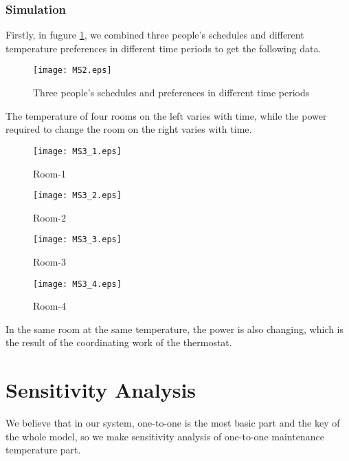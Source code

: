 \documentclass{mcmthesis}
\begin{document}
				
			
			\subsubsection{Simulation}
				Firstly, in fugure \ref{fig:M4_P}, we combined three people's schedules and different temperature preferences in different time periods to get the following data.
				
				\begin{figure}[htb]
					\small
					\centering
					\texttt{[image: MS2.eps]}
					\caption{Three people's schedules and preferences in different time periods} \label{fig:M4_P}
				\end{figure}
			
				The temperature of four rooms on the left varies with time, while the power required to change the room on the right varies with time. 
				
				\begin{figure}[h]
					\small
					\centering
					\texttt{[image: MS3\_1.eps]}
					\caption{Room-1} 
					\label{fig:M4_R1}
				\end{figure}
				\begin{figure}[H]
					\small
					\centering
					\texttt{[image: MS3\_2.eps]}
					\caption{Room-2} 
					\label{fig:M4_R2}
				\end{figure}
				\begin{figure}[htbp]
					\small
					\centering
					\texttt{[image: MS3\_3.eps]}
					\caption{Room-3} 
					\label{fig:M4_R3}
				\end{figure}
				\begin{figure}[H]
					\small
					\centering
					\texttt{[image: MS3\_4.eps]}
					\caption{Room-4} 
					\label{fig:M4_R4}
				\end{figure}
			
				
				In the same room at the same temperature, the power is also changing, which is the result of the coordinating work of the thermostat.
				
				
	
	\section{Sensitivity Analysis}
	
		We believe that in our system, one-to-one is the most basic part and the key of the whole model, so we make sensitivity analysis of one-to-one maintenance temperature part.
		
\end{document}
